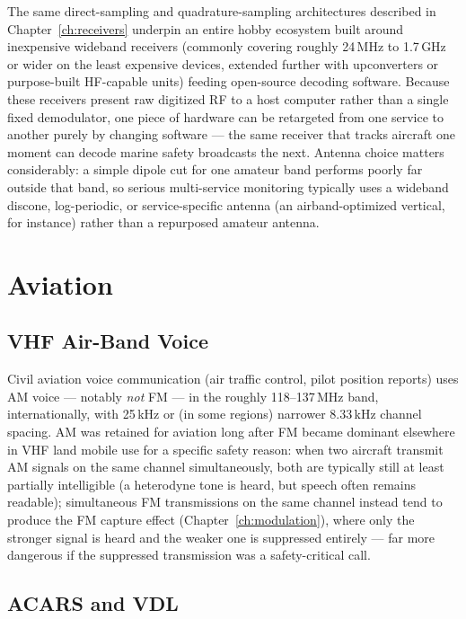 The same direct-sampling and quadrature-sampling architectures
described in Chapter~\ref{ch:receivers} underpin an entire hobby
ecosystem built around inexpensive wideband receivers (commonly
covering roughly 24\,MHz to 1.7\,GHz or wider on the least expensive
devices, extended further with upconverters or purpose-built HF-capable
units) feeding open-source decoding software. Because these receivers
present raw digitized RF to a host computer rather than a single fixed
demodulator, one piece of hardware can be retargeted from one service to
another purely by changing software --- the same receiver that tracks
aircraft one moment can decode marine safety broadcasts the next.
Antenna choice matters considerably: a simple dipole cut for one amateur
band performs poorly far outside that band, so serious multi-service
monitoring typically uses a wideband discone, log-periodic, or
service-specific antenna (an airband-optimized vertical, for instance)
rather than a repurposed amateur antenna.

\section{Aviation}

\subsection{VHF Air-Band Voice}

Civil aviation voice communication (air traffic control, pilot
position reports) uses AM voice --- notably \emph{not} FM ---
in the roughly 118--137\,MHz band, internationally, with 25\,kHz or (in
some regions) narrower 8.33\,kHz channel spacing. AM was retained for
aviation long after FM became dominant elsewhere in VHF land mobile use
for a specific safety reason: when two aircraft transmit AM signals on
the same channel simultaneously, both are typically still at least
partially intelligible (a heterodyne tone is heard, but speech often
remains readable); simultaneous FM transmissions on the same channel
instead tend to produce the FM capture effect (Chapter~\ref{ch:modulation}),
where only the stronger signal is heard and the weaker one is
suppressed entirely --- far more dangerous if the suppressed
transmission was a safety-critical call.

\subsection{ACARS and VDL}

